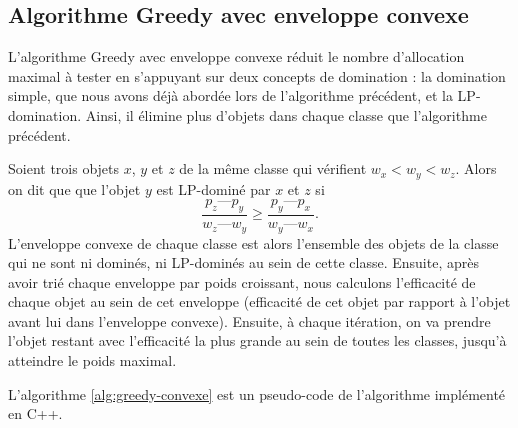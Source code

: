 \documentclass{article}
\begin{document}
\subsection{Algorithme Greedy avec enveloppe convexe}
L'algorithme Greedy avec enveloppe convexe réduit le nombre d'allocation maximal à tester en s'appuyant sur deux concepts de domination : la domination simple, que nous avons déjà abordée lors de l'algorithme précédent, et la LP-domination. Ainsi, il élimine plus d'objets dans chaque classe que l'algorithme précédent. 

Soient trois objets $x$, $y$ et $z$ de la même classe qui vérifient $w_{x} < w_{y} < w_{z}$. Alors on dit que que l'objet $y$ est LP-dominé par $x$ et $z$ si 
\[ \frac{p_z—p_y}{w_z—w_y} \geq \frac{p_y—p_x}{w_y—w_x}. \]
L'enveloppe convexe de chaque classe est alors l'ensemble des objets de la classe qui ne sont ni dominés, ni LP-dominés au sein de cette classe. Ensuite, après avoir trié chaque enveloppe par poids croissant, nous calculons l'efficacité de chaque objet au sein de cet enveloppe (efficacité de cet objet par rapport à l'objet avant lui dans l'enveloppe convexe). Ensuite, à chaque itération, on va prendre l'objet restant avec l'efficacité la plus grande au sein de toutes les classes, jusqu'à atteindre le poids maximal.

L'algorithme \ref{alg:greedy-convexe} est un pseudo-code de l'algorithme implémenté en C++.
\end{document}
